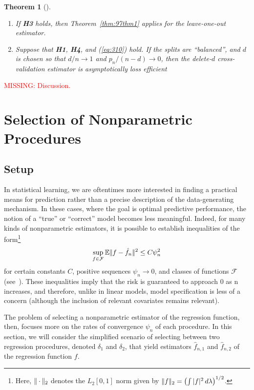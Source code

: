 \documentclass[11pt, letter paper]{article}
\newcommand{\1}{\mathmybb{1}}
\newtheorem{theorem}[proposition]{Theorem}
\newcommand{\0}{\emptyset}
\newcommand{\E}{\mathbb{E}}
\newcommand{\paren}[1]{\left(#1 \right)}
\newcommand{\norm}[1]{|\hspace{-1pt}|#1 |\hspace{-1pt}|}
\newcommand{\normsq}[1]{\norm{#1}^{2}}
\newcommand{\Fcal}{\mathcal{F}}
\begin{document}
\begin{theorem}[\cite{shao_1997}]\label{thm:97thm45}
    \( \)

    \begin{enumerate}
        \item If \textbf{H3} holds, then Theorem~\ref{thm:97thm1} applies for the leave-one-out estimator.
        \item Suppose that \textbf{H1}, \textbf{H4}, and (\ref{eq:310}) hold. If the splits are ``balanced'', and \(d\) is chosen so that \(d/n\to1\) and \(p_n/(n-d) \to 0\), then the delete-\(d\) cross-validation estimator is asymptotically loss efficient 
    \end{enumerate}
\end{theorem}

\textcolor{red}{MISSING: Discussion.}


\section{Selection of Nonparametric Procedures}

\subsection{Setup}

In statistical learning, we are oftentimes more interested in finding a practical means for prediction rather than a precise description of the data-generating mechanism. In these cases, where the goal is optimal predictive performance, the notion of a ``true'' or ``correct'' model becomes less meaningful. Indeed, for many kinds of nonparametric estimators, it is possible to establish inequalities of the form\footnote{Here, \(\norm{\cdot}_{2}\) denotes the \(L_{2}[0,1]\) norm given by \(\norm{f}_{2} = \paren{\int |f|^{2}\,d\lambda}^{1/2}\).}
\[\sup_{f\in\Fcal}\E{\normsq{f - \hat{f}_{n}}} \leq C\psi_{n}^{2}\]
for certain constants \(C\), positive sequences \(\psi_{n}\to 0\), and classes of functions \(\Fcal\) (see~\cite{tsybakov_introduction_2009}). These inequalities imply that the risk is guaranteed to approach 0 as n increases, and therefore, unlike in linear models, model specification is less of a concern (although the inclusion of relevant covariates remains relevant). 

The problem of selecting a nonparametric estimator of the regression function, then, focuses more on the rates of convergence \(\psi_{n}\) of each procedure. In this section, we will consider the simplified scenario of selecting between 
two regression procedures, denoted \(\delta_{1}\) and \(\delta_{2}\), that yield estimators \(\hat{f}_{n, 1}\) and \(\hat{f}_{n, 2}\) of the regression function \(f\).
\end{document}
